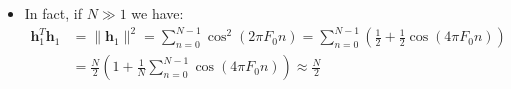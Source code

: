 \begin{itemize}
\[
\mathbf{H} = [\,\mathbf{h}_{1}\ \mathbf{h}_{2}\,], \quad
\text{where}\quad
\begin{cases}
\mathbf{h}_{1} \triangleq
\big[\,1,\ \cos(2\pi F_{0}),\ \ldots,\ \cos(2\pi F_{0}(N-1))\,\big]^{T}\\
\mathbf{h}_{2} \triangleq
\big[\,0,\ \sin(2\pi F_{0}),\ \ldots,\ \sin(2\pi F_{0}(N-1))\,\big]^{T}
\end{cases}
\]
\begin{align*}
\mathbf{H}^{\#}
&= (\mathbf{H}^{T}\mathbf{H})^{-1}\mathbf{H}^{T}
 = \begin{bmatrix}
\mathbf{h}_{1}^{T} \\
\mathbf{h}_{2}^{T}
\end{bmatrix}
[\,\mathbf{h}_{1}\ \mathbf{h}_{2}\,]^{-1}
\begin{bmatrix}
\mathbf{h}_{1}^{T} \\
\mathbf{h}_{2}^{T}
\end{bmatrix}  \\[4pt]
&= \begin{bmatrix}
\mathbf{h}_{1}^{T}\mathbf{h}_{1} & \mathbf{h}_{1}^{T}\mathbf{h}_{2} \\
\mathbf{h}_{2}^{T}\mathbf{h}_{1} & \mathbf{h}_{2}^{T}\mathbf{h}_{2}
\end{bmatrix}^{-1}
\begin{bmatrix}
\mathbf{h}_{1}^{T} \\
\mathbf{h}_{2}^{T}
\end{bmatrix}
= \begin{bmatrix}
N/2 & 0 \\
0 & N/2
\end{bmatrix}^{-1}
\begin{bmatrix}
\mathbf{h}_{1}^{T} \\
\mathbf{h}_{2}^{T}
\end{bmatrix}
= \frac{2}{N}
\begin{bmatrix}
\mathbf{h}_{1}^{T} \\
\mathbf{h}_{2}^{T}
\end{bmatrix}
\end{align*}
\item In fact, if \(N\gg1\) we have:
\begin{align*}
\mathbf{h}_{1}^{T}\mathbf{h}_{1}
&= \lVert \mathbf{h}_{1} \rVert^{2}
 = \sum_{n=0}^{N-1} \cos^{2}(2\pi F_{0} n)
 = \sum_{n=0}^{N-1} \left(\frac{1}{2} + \frac{1}{2}\cos(4\pi F_{0} n)\right) \\[4pt]
&= \frac{N}{2}
   \left(1 + \frac{1}{N}\sum_{n=0}^{N-1}\cos(4\pi F_{0} n)\right)
 \approx \frac{N}{2}

\end{align*}
\end{itemize}
